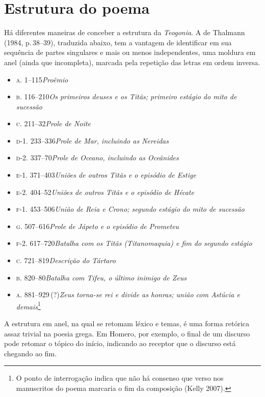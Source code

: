 \section{Estrutura do poema}

Há diferentes maneiras de conceber a estrutura da \textit{Teogonia}. A de
Thalmann (1984, p.\,38--39), traduzida abaixo, tem a vantagem de
identificar em sua sequência de partes singulares e mais ou menos
independentes, uma moldura em anel (ainda que incompleta), marcada pela
repetição das letras em ordem inversa.

\begin{itemize}
\item \textsc{a.} 1--115\quad \textit{Proêmio}
\item \textsc{b.} 116--210\quad \textit{Os primeiros deuses e os Titãs; primeiro estágio do mito de sucessão}
\item \textsc{c.} 211--32\quad \textit{Prole de Noite}
\item \textsc{d-1.} 233--336\quad \textit{Prole de Mar, incluindo as Nereidas}
\item \textsc{d-2.} 337--70\quad \textit{Prole de Oceano, incluindo as Oceânides}
\item \textsc{e-1.} 371--403\quad \textit{Uniões de outros Titãs e o episódio de Estige}
\item \textsc{e-2.} 404--52\quad \textit{Uniões de outros Titãs e o episódio de Hécate}
\item \textsc{f-1.} 453--506\quad \textit{União de Reia e Crono; segundo estágio do mito de sucessão}
\item \textsc{g.} 507--616\quad \textit{Prole de Jápeto e o episódio de Prometeu}
\item \textsc{f-2.} 617--720\quad \textit{Batalha com os Titãs (Titanomaquia) e fim do segundo estágio}
\item \textsc{c.} 721--819\quad \textit{Descrição do Tártaro}
\item \textsc{b.} 820--80\quad \textit{Batalha com Tifeu, o último inimigo de Zeus}
\item \textsc{a.} 881--929\,(?)\quad \textit{Zeus torna-se rei e divide as honras; união com Astúcia e demais}\footnote{O ponto de interrogação indica que não há consenso que verso nos manuscritos do poema marcaria o fim da composição (Kelly 2007).} 
\end{itemize}

A estrutura em anel, na qual se retomam léxico e temas, é uma forma
retórica assaz trivial na poesia grega. Em Homero, por exemplo, o final
de um discurso pode retomar o tópico do início, indicando ao receptor
que o discurso está chegando ao fim.

